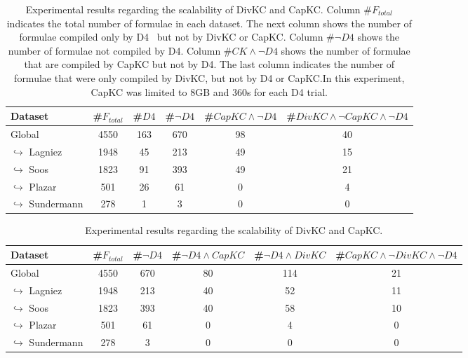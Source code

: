 \documentclass{article}
\newcommand\dfour[0]{D4\xspace}
\newcommand\divkc[0]{DivKC\xspace}
\newcommand\capkc[0]{CapKC\xspace}
\begin{document}
    
\begin{table}[h!]
        \centering
        \begin{tabular}{l|c|c|c|c|c}
            Dataset & \#$F_\textit{total}$ & \#$\textit{\dfour}$ & \#$\neg \textit{\dfour}$ & \#$\textit{\capkc} \land \neg \textit{\dfour}$ & \#$\textit{\divkc} \land \neg \textit{\capkc} \land \neg \textit{\dfour}$ \\ 
            \hline
Global & 4550 & 163 & 670 & 98 & 40 \\
$\hookrightarrow$ Lagniez \cite{D4} & 1948 & 45 & 213 & 49 & 15 \\
$\hookrightarrow$ Soos \cite{soos_2024_10449477} & 1823 & 91 & 393 & 49 & 21 \\
$\hookrightarrow$ Plazar \cite{Plazar2019} & 501 & 26 & 61 & 0 & 4 \\
$\hookrightarrow$ Sundermann \cite{SBK+:SPLC24} & 278 & 1 & 3 & 0 & 0 \\
    \end{tabular}
            \caption{Experimental results regarding the scalability of \divkc and \capkc.
            Column \#$F_\textit{total}$ indicates the total number of formulae in each dataset.
            The next column shows the number of formulae compiled only by \dfour~\cite{D4} but not by \divkc or \capkc.
            Column \#$\neg\textit{\dfour}$ shows the number of formulae not compiled by \dfour.
            Column \#$\textit{CK} \land \neg \textit{\dfour}$ shows the number of formulae that are compiled by \capkc but not by \dfour.
            The last column indicates the number of formulae that were only compiled by \divkc, but not by \dfour or \capkc.In this experiment, \capkc was limited to 8GB and 360s for each \dfour trial.
        }
        \label{divkc:tab:gen}
    \end{table}

    
\begin{table}[h!]
        \centering
        \begin{tabular}{l|c|c|c|c|c}
            Dataset & \#$F_\textit{total}$ & \#$\neg \textit{\dfour}$ & \#$\neg \textit{\dfour} \land \textit{\capkc}$ & \#$\neg \textit{\dfour} \land \textit{\divkc}$ &  \#$\textit{\capkc} \land \neg \textit{\divkc} \land \neg \textit{\dfour}$\\ 
            \hline
Global & 4550 & 670 & 80 & 114 & 21 \\
$\hookrightarrow$ Lagniez \cite{D4} & 1948 & 213 & 40 & 52 & 11 \\
$\hookrightarrow$ Soos \cite{soos_2024_10449477} & 1823 & 393 & 40 & 58 & 10 \\
$\hookrightarrow$ Plazar \cite{Plazar2019} & 501 & 61 & 0 & 4 & 0 \\
$\hookrightarrow$ Sundermann \cite{SBK+:SPLC24} & 278 & 3 & 0 & 0 & 0 \\
    \end{tabular}
            \caption{Experimental results regarding the scalability of \divkc and \capkc.
        }
        \label{divkc:tab:gen}
    \end{table}
\end{document}
